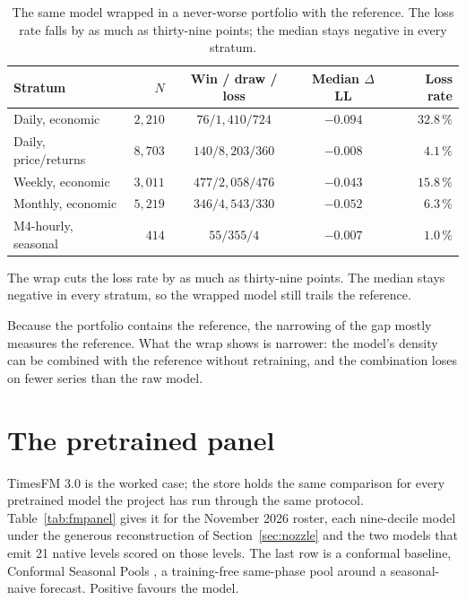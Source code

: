 \documentclass[article]{jss}
\begin{document}
\begin{table}[t!]
\centering
\begin{tabular}{lrccr}
\toprule
Stratum & $N$ & Win / draw / loss & Median $\Delta$LL & Loss rate \\
\midrule
Daily, economic       & $2{,}210$ & $76 / 1{,}410 / 724$ & $-0.094$ & $32.8\,\%$ \\
Daily, price/returns  & $8{,}703$ & $140 / 8{,}203 / 360$ & $-0.008$ & $4.1\,\%$ \\
Weekly, economic      & $3{,}011$ & $477 / 2{,}058 / 476$ & $-0.043$ & $15.8\,\%$ \\
Monthly, economic     & $5{,}219$ & $346 / 4{,}543 / 330$ & $-0.052$ & $6.3\,\%$ \\
M4-hourly, seasonal   & $414$ & $55 / 355 / 4$ & $-0.007$ & $1.0\,\%$ \\
\bottomrule
\end{tabular}
\caption{The same model wrapped in a never-worse portfolio with the reference.
The loss rate falls by as much as thirty-nine points; the median stays negative
in every stratum.}
\label{tab:wrapped}
\end{table}

The wrap cuts the loss rate by as much as thirty-nine points. The median stays
negative in every stratum, so the wrapped model still trails the reference.

Because the portfolio contains the reference, the narrowing of the gap mostly
measures the reference. What the wrap shows is narrower: the model's density can
be combined with the reference without retraining, and the combination loses on
fewer series than the raw model.

\section{The pretrained panel}\label{sec:panel}

TimesFM 3.0 is the worked case; the store holds the same comparison for every
pretrained model the project has run through the same protocol.
Table~\ref{tab:fmpanel} gives it for the November 2026 roster, each nine-decile
model under the generous reconstruction of Section~\ref{sec:nozzle} and the
two models that emit 21 native levels scored on those levels. The last row is
a conformal baseline, Conformal Seasonal Pools \citep{manokhin2026csp}, a
training-free same-phase pool around a seasonal-naive forecast. Positive
favours the model.
\end{document}

